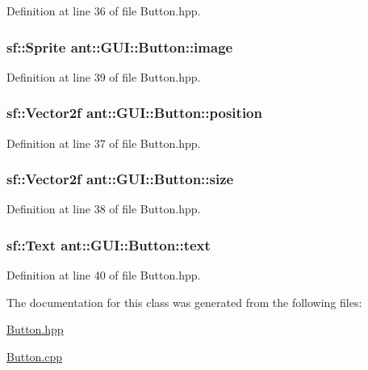 Definition at line 36 of file Button.\+hpp.

\hypertarget{classant_1_1_g_u_i_1_1_button_a25b63a495b3ca48c5384a6304401a14c}{
\subsubsection[{image}]{\setlength{\rightskip}{0pt plus 5cm}sf\+::\+Sprite ant\+::\+G\+U\+I\+::\+Button\+::image\hspace{0.3cm}{\ttfamily [private]}}}\label{classant_1_1_g_u_i_1_1_button_a25b63a495b3ca48c5384a6304401a14c}


Definition at line 39 of file Button.\+hpp.

\hypertarget{classant_1_1_g_u_i_1_1_button_a68b670cec9ef8de0bb26bf67bb0313f5}{
\subsubsection[{position}]{\setlength{\rightskip}{0pt plus 5cm}sf\+::\+Vector2f ant\+::\+G\+U\+I\+::\+Button\+::position\hspace{0.3cm}{\ttfamily [private]}}}\label{classant_1_1_g_u_i_1_1_button_a68b670cec9ef8de0bb26bf67bb0313f5}


Definition at line 37 of file Button.\+hpp.

\hypertarget{classant_1_1_g_u_i_1_1_button_a6c6e3fddc805d48d43990ba533aeb01d}{
\subsubsection[{size}]{\setlength{\rightskip}{0pt plus 5cm}sf\+::\+Vector2f ant\+::\+G\+U\+I\+::\+Button\+::size\hspace{0.3cm}{\ttfamily [private]}}}\label{classant_1_1_g_u_i_1_1_button_a6c6e3fddc805d48d43990ba533aeb01d}


Definition at line 38 of file Button.\+hpp.

\hypertarget{classant_1_1_g_u_i_1_1_button_a1b7b25b11fa7522434fe6d9d5ac79d95}{
\subsubsection[{text}]{\setlength{\rightskip}{0pt plus 5cm}sf\+::\+Text ant\+::\+G\+U\+I\+::\+Button\+::text\hspace{0.3cm}{\ttfamily [private]}}}\label{classant_1_1_g_u_i_1_1_button_a1b7b25b11fa7522434fe6d9d5ac79d95}


Definition at line 40 of file Button.\+hpp.



The documentation for this class was generated from the following files\+:\begin{DoxyCompactItemize}
\item 
\hyperlink{_button_8hpp}{Button.\+hpp}\item 
\hyperlink{_button_8cpp}{Button.\+cpp}\end{DoxyCompactItemize}
